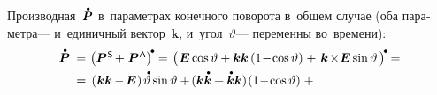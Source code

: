 \begin{otherlanguage}{russian}
Производная~${\mathdotabove{\bm{P}}}$ в~параметрах конечного поворота в~общем случае (оба параметра\:--- и~единичный вектор~$\bm{k}$, и~угол~$\vartheta$\:--- переменны во~времени):
\vspace{0.32em}%
\[\begin{array}{r@{\hspace{0.33em}}c@{\hspace{0.25em}}l}
\mathdotabove{\bm{P}} \hspace{0.2em} & = & \hspace{0.1em} \left(\bm{P}^{\mathsf{\hspace{0.12ex}S}} \hspace{-0.2ex} +^{\mathstrut} \bm{P}^{\mathsf{\hspace{0.12ex}A}}\right)^{\hspace{-0.2ex}\tikz[baseline=-0.5ex]\draw[black, fill=black] (0,0) circle (.266ex);} =
\hspace{0.1em} \left(\hspace{0.2ex} \tikzmark{StartBracePs} {\bm{E} \operatorname{cos} \vartheta + \bm{k} \bm{k} \left({1 \!-\! \operatorname{cos} \vartheta}\right)} \hspace{-0.2ex} \tikzmark{EndBracePs} \hspace{0.32ex} +^{\mathstrut} \hspace{0.2ex}
\tikzmark{StartBracePa} {\bm{k} \hspace{-0.24ex}\times\hspace{-0.4ex} \bm{E} \operatorname{sin} \vartheta \hspace{0.2ex}} \tikzmark{EndBracePa} {} \hspace{0.16ex}\right)^{\hspace{-0.2ex}\tikz[baseline=-0.5ex]\draw[black, fill=black] (0,0) circle (.266ex);} \hspace{-0.05em} = \\[0.4em]
%
& = & \hspace{0.2em} \tikzmark{StartBraceDotPs} {\left( \hspace{0.1ex} \bm{k} \bm{k} \hspace{-0.1ex} - \hspace{-0.2ex} \bm{E} \hspace{0.1ex} \right) \hspace{-0.1ex} \mathdotabove{\vartheta} \operatorname{sin} \vartheta + \hspace{-0.2ex} ( \bm{k} \mathdotabove{\bm{k}} + \mathdotabove{\bm{k}} \bm{k} ) \hspace{-0.2ex} \left({1 \!-\! \operatorname{cos} \vartheta}\right)} \tikzmark{EndBraceDotPs} \hspace{0.64ex} + \\[0.64em]

\end{array}\]
\end{otherlanguage}

